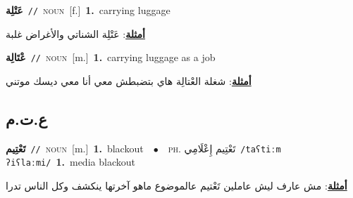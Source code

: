 \documentclass[10pt,a4paper,twoside]{article} %
\begin{document}
\begin{multicols}{2}
{{{{{{{{{{{{\setlength\topsep{0pt}\textbf{\foreignlanguage{arabic}{عَتْلِة}}\ {\color{gray}\texttt{//}\color{black}}\ \textsc{noun}\ [f.]\ \textbf{1.}~carrying luggage\  \begin{flushright}\color{gray}\foreignlanguage{arabic}{\textbf{\underline{\foreignlanguage{arabic}{أمثلة}}}: عَتْلِة الشناتي والأغراض غلبة}\end{flushright}\color{black}} \vspace{2mm}

{\setlength\topsep{0pt}\textbf{\foreignlanguage{arabic}{عْتَالِة}}\ {\color{gray}\texttt{//}\color{black}}\ \textsc{noun}\ [m.]\ \textbf{1.}~carrying luggage as a job\  \begin{flushright}\color{gray}\foreignlanguage{arabic}{\textbf{\underline{\foreignlanguage{arabic}{أمثلة}}}: شغلة العْتالِة هاي بتضبطش معي أنا معي ديسك موتني}\end{flushright}\color{black}} \vspace{2mm}

\vspace{-3mm}
\subsection*{\color{blue}\foreignlanguage{arabic}{ع.ت.م}\color{blue}{}} 

{\setlength\topsep{0pt}\textbf{\foreignlanguage{arabic}{تَعْتِيم}}\ {\color{gray}\texttt{//}\color{black}}\ \textsc{noun}\ [m.]\ \textbf{1.}~blackout\ \ $\bullet$\ \ \textsc{ph.} \color{gray} \foreignlanguage{arabic}{تَعْتِيم إِعْلَامِي}\color{black}\ {\color{gray}\texttt{/{\sffamily taʕtiːm ʔiʕlaːmi}/}\color{black}}\ \textbf{1.}~media blackout\  \begin{flushright}\color{gray}\foreignlanguage{arabic}{\textbf{\underline{\foreignlanguage{arabic}{أمثلة}}}: مش عارف ليش عاملين تَعْتيم عالموضوع ماهو آخرتها ينكشف وكل الناس تدرا}\end{flushright}\color{black}} \vspace{2mm}

}}}}}}}}}}}
\end{multicols}
\end{document}
